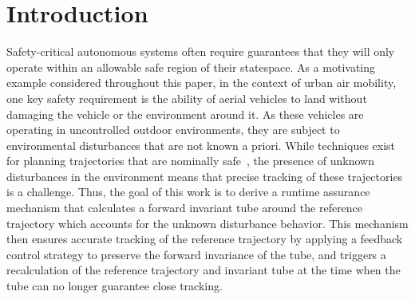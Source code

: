 \documentclass{IEEEojcsys}
\begin{document}
\maketitle


\section{Introduction}
\label{section:introduction}
Safety-critical autonomous systems often require guarantees that they will only operate within an allowable safe region of their statespace.
As a motivating example considered throughout this paper, in the context of urban air mobility, one key safety requirement is the ability of aerial vehicles to land without damaging the vehicle or the environment around it. As these vehicles are operating in uncontrolled outdoor environments, they are subject to environmental disturbances that are not known a priori. While techniques exist for planning trajectories that are nominally safe~\cite{heidari2021trajectory}, 
the presence of unknown disturbances in the environment means that precise tracking of these trajectories is a challenge. Thus, the goal of this work is to derive a runtime assurance mechanism
that calculates a forward invariant tube around the reference trajectory which accounts for the unknown disturbance behavior. This mechanism then ensures accurate tracking of the reference trajectory by applying a feedback control strategy to preserve the forward invariance of the tube, and triggers a recalculation of the reference trajectory and invariant tube at the time when the tube can no longer guarantee close tracking. %
\end{document}
